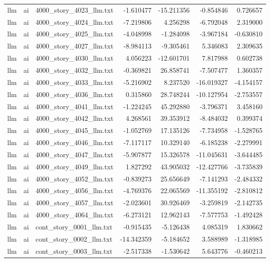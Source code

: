 \begin{longtable}{lllrrrr}
llm & ai & 4000\_story\_4023\_llm.txt & -1.610477 & -15.211356 & -0.854846 & 0.726657 \\
llm & ai & 4000\_story\_4024\_llm.txt & -7.219806 & 4.256298 & -6.792048 & 2.319000 \\
llm & ai & 4000\_story\_4025\_llm.txt & -4.048998 & -1.284098 & -3.967184 & -0.630810 \\
llm & ai & 4000\_story\_4027\_llm.txt & -8.984113 & -9.305461 & 5.346083 & 2.309635 \\
llm & ai & 4000\_story\_4030\_llm.txt & 4.056223 & -12.601701 & 7.817988 & 0.602738 \\
llm & ai & 4000\_story\_4032\_llm.txt & -0.369821 & 26.858741 & -7.507477 & 1.360357 \\
llm & ai & 4000\_story\_4033\_llm.txt & -5.216902 & 8.237520 & -16.019327 & -4.154157 \\
llm & ai & 4000\_story\_4036\_llm.txt & 0.315860 & 28.748244 & -10.127954 & -2.753557 \\
llm & ai & 4000\_story\_4041\_llm.txt & -1.224245 & 45.292880 & -3.796371 & 3.458160 \\
llm & ai & 4000\_story\_4042\_llm.txt & 4.268561 & 39.353912 & -8.484032 & 0.399374 \\
llm & ai & 4000\_story\_4045\_llm.txt & -1.052769 & 17.135126 & -7.734958 & -1.528765 \\
llm & ai & 4000\_story\_4046\_llm.txt & -7.117117 & 10.329140 & -6.185238 & -2.279991 \\
llm & ai & 4000\_story\_4047\_llm.txt & -5.907877 & 15.326578 & -11.045631 & -3.644485 \\
llm & ai & 4000\_story\_4049\_llm.txt & 1.827292 & 43.905032 & -12.427766 & -3.735839 \\
llm & ai & 4000\_story\_4052\_llm.txt & -0.839273 & 25.656649 & -7.141293 & -2.484332 \\
llm & ai & 4000\_story\_4056\_llm.txt & -4.769376 & 22.065569 & -11.355192 & -2.810812 \\
llm & ai & 4000\_story\_4057\_llm.txt & -2.023601 & 30.926469 & -3.259819 & -2.142735 \\
llm & ai & 4000\_story\_4064\_llm.txt & -6.273121 & 12.962143 & -7.577753 & -1.492428 \\
llm & ai & cont\_story\_0001\_llm.txt & -0.915435 & -5.126438 & 4.085319 & 1.830662 \\
llm & ai & cont\_story\_0002\_llm.txt & -14.342359 & -5.184652 & 3.588989 & -1.318985 \\
llm & ai & cont\_story\_0003\_llm.txt & -2.517338 & -1.530642 & 5.643776 & -0.460213 \\

\end{longtable}
